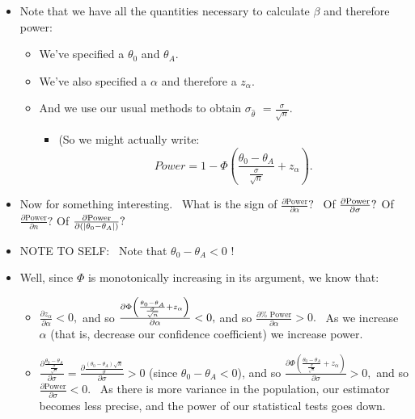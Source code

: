 \documentclass[11pt]{article}
\begin{document}
\begin{itemize}
\item Note that we have all the quantities necessary to calculate $\beta $
and therefore power:

\begin{itemize}
\item We've specified a $\theta _{0}$ and $\theta _{A}.$

\item We've also specified a $\alpha $ and therefore a $z_{\alpha }.$

\item And we use our usual methods to obtain $\sigma _{\widehat{\theta }}$ $=%
\frac{\sigma }{\sqrt{n}}.$

\begin{itemize}
\item (So we might actually write: \ 
\begin{equation*}
Power=1-\Phi \left( \frac{\theta _{0}-\theta _{A}}{\frac{\sigma }{\sqrt{n}}}%
+z_{\alpha }\right) .
\end{equation*}
\end{itemize}
\end{itemize}

\item Now for something interesting. \ What is the sign of $\frac{\partial 
\text{Power}}{\partial \alpha }?$ \ Of $\frac{\partial \text{Power}}{%
\partial \sigma }?$ Of $\frac{\partial \text{Power}}{\partial n}?$ Of $\frac{%
\partial \text{Power}}{\partial \left( \left\vert \theta _{0}-\theta
_{A}\right\vert \right) }?$

\item NOTE TO SELF: \ Note that $\theta _{0}-\theta _{A}<0$ !

\item Well, since $\Phi $ is monotonically increasing in its argument, we
know that:

\begin{itemize}
\item $\frac{\partial z_{\alpha }}{\partial \alpha }<0,$ and so $\frac{%
\partial \Phi \left( \frac{\theta _{0}-\theta _{A}}{\frac{\sigma }{\sqrt{n}}}%
+z_{\alpha }\right) }{\partial \alpha }<0,$ and so $\frac{\partial \text{%
Power}}{\partial \alpha }>0.$ \ As we increase $\alpha $ (that is, decrease
our confidence coefficient) we increase power.

\item $\frac{\partial \frac{\theta _{0}-\theta _{A}}{\frac{\sigma }{\sqrt{n}}%
}}{\partial \sigma }=\frac{\partial \frac{\left( \theta _{0}-\theta
_{A}\right) \sqrt{n}}{\sigma }}{\partial \sigma }>0$ (since $\theta
_{0}-\theta _{A}<0$), and so $\frac{\partial \Phi \left( \frac{\theta
_{0}-\theta _{A}}{\frac{\sigma }{\sqrt{n}}}+z_{\alpha }\right) }{\partial
\sigma }>0,$ and so $\frac{\partial \text{Power}}{\partial \sigma }<0.$ \ As
there is more variance in the population, our estimator becomes less
precise, and the power of our statistical tests goes down.


\end{itemize}
\end{itemize}
\end{document}

